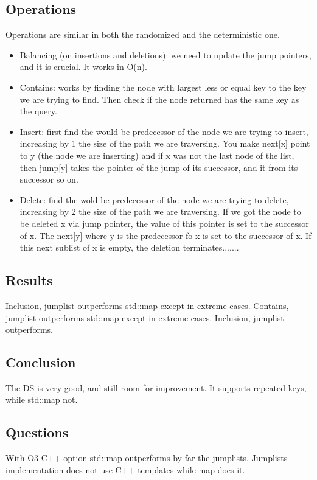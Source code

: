\documentclass[a4paper, 10pt]{article}
\begin{document}
\subsection{Operations}
Operations are similar in both the randomized and the deterministic one. 
\begin{itemize}
	\item Balancing (on insertions and deletions): we need to update the jump pointers, and it is crucial. It works in O(n).
	\item Contains: works by finding the node with largest less or equal key to the key we are trying to find. Then check if the node returned has the same key as the query.
	\item Insert: first find the would-be predecessor of the node we are trying to insert, increasing by 1 the size of the path we are traversing. You make next[x] point to y (the node we are inserting) and if x was not the last node of the list, then jump[y] takes the pointer of the jump of its successor, and it from its successor so on.
	\item Delete: find the wold-be predecessor of the node we are trying to delete, increasing by 2 the size of the path we are traversing. If we got the node to be deleted x via jump pointer, the value of this pointer is set to the successor of x. The next[y] where y is the predecessor fo x is set to the successor of x. If this next sublist of x is empty, the deletion terminates.......
\end{itemize}

\subsection{Results}
Inclusion, jumplist outperforms std::map except in extreme cases. Contains, jumplist outperforms std::map except in extreme cases. Inclusion, jumplist outperforms.

\subsection{Conclusion}
The DS is very good, and still room for improvement. It supports repeated keys, while std::map not.

\subsection{Questions}
With O3 C++ option std::map outperforms by far the jumplists. Jumplists implementation does not use C++ templates while map does it.
\end{document}

